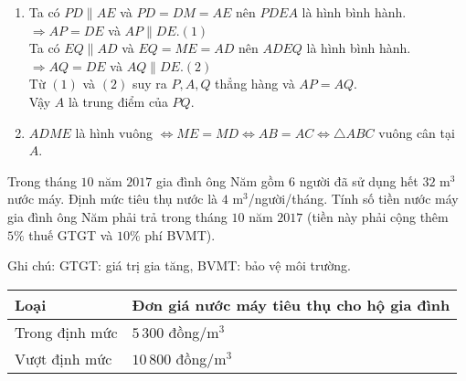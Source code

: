 \begin{bt}
{\begin{enumerate}
{
}
Tương tự, ta có $E$ là trung điểm của $AC$.\\
Do $MD\parallel EC$ và $MD=\dfrac{AC}{2}=EC$ nên $MDEC$ là hình bình hành.
\item Ta có $PD\parallel AE$ và $PD=DM=AE$ nên $PDEA$ là hình bình hành.\\
$\Rightarrow AP=DE$ và $AP\parallel DE$.\hfill $(1)$\\
Ta có $EQ\parallel AD$ và $EQ=ME=AD$ nên $ADEQ$ là hình bình hành.\\
$\Rightarrow AQ=DE$ và $AQ\parallel DE$.\hfill $(2)$ \\
Từ $(1)$ và $(2)$ suy ra $P, A, Q$ thẳng hàng và $AP=AQ$.\\
Vậy $A$ là trung điểm của $PQ$.
\item $ADME$ là hình vuông $\Leftrightarrow ME=MD\Leftrightarrow AB=AC\Leftrightarrow \triangle ABC$ vuông cân tại $A$.
\end{enumerate}
}
\end{bt}

\begin{bt}%
Trong tháng $10$ năm $2017$ gia đình ông Năm gồm $6$ người đã sử dụng hết $32$ m$^3$ nước máy. Định mức tiêu thụ nước là $4$ m$^3$/người/tháng. Tính số tiền nước máy gia đình ông Năm phải trả trong tháng $10$ năm $2017$ (tiền này phải cộng thêm $5\%$ thuế GTGT và $10\%$ phí BVMT).
\begin{center}
Ghi chú: GTGT: giá trị gia tăng, BVMT: bảo vệ môi trường.\\
\begin{tabular}{|l|l|}
\hline 
Loại &  Đơn giá nước máy tiêu thụ cho hộ gia đình\\ 
\hline 
Trong định mức &  $5\, 300$ đồng/m$^3$\\ 
\hline 
Vượt định mức &  $10\, 800$ đồng/m$^3$\\ 
\hline 
\end{tabular} 
\end{center}
\end{bt}

